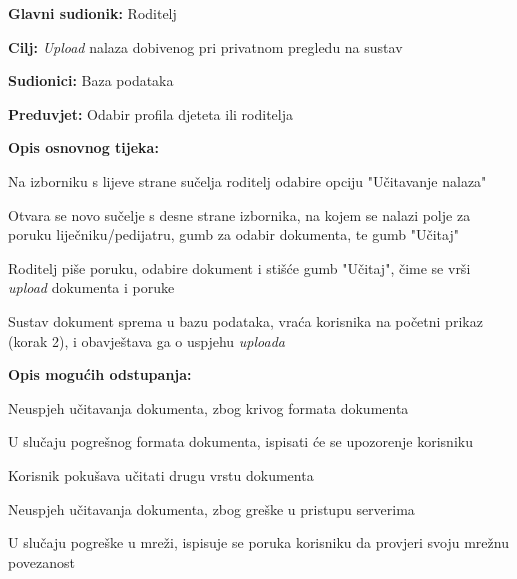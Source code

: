 					\noindent {}
					\begin{packed_item}
						
						\item \textbf{Glavni sudionik: }Roditelj
						\item  \textbf{Cilj:} \textit{Upload} nalaza dobivenog pri privatnom pregledu na sustav
						\item  \textbf{Sudionici:} Baza podataka
						\item  \textbf{Preduvjet:} Odabir profila djeteta ili roditelja
						\item  \textbf{Opis osnovnog tijeka:}
						
						\item[] \begin{packed_enum}
							
							\item Na izborniku s lijeve strane sučelja roditelj odabire opciju "Učitavanje nalaza"
							\item Otvara se novo sučelje s desne strane izbornika, na kojem se nalazi polje za poruku liječniku/pedijatru, gumb za odabir dokumenta, te gumb "Učitaj"
							\item Roditelj piše poruku, odabire dokument i stišće gumb "Učitaj", čime se vrši \textit{upload} dokumenta i poruke
							\item Sustav dokument sprema u bazu podataka, vraća korisnika na početni prikaz (korak 2), i obavještava ga o uspjehu \textit{uploada}
						\end{packed_enum}
						
						\item  \textbf{Opis mogućih odstupanja:}
						
						\item[] \begin{packed_item}
							\item[3.a] Neuspjeh učitavanja dokumenta, zbog krivog formata dokumenta
							\item[] \begin{packed_enum}
								\item U slučaju pogrešnog formata dokumenta, ispisati će se upozorenje korisniku
								\item Korisnik pokušava učitati drugu vrstu dokumenta
							\end{packed_enum}
							\item[3.b] Neuspjeh učitavanja dokumenta, zbog greške u pristupu serverima
							\item[] \begin{packed_enum}
								\item U slučaju pogreške u mreži, ispisuje se poruka korisniku da provjeri svoju mrežnu povezanost
							\end{packed_enum}
							
						\end{packed_item}
					\end{packed_item}
					\clearpage
					
